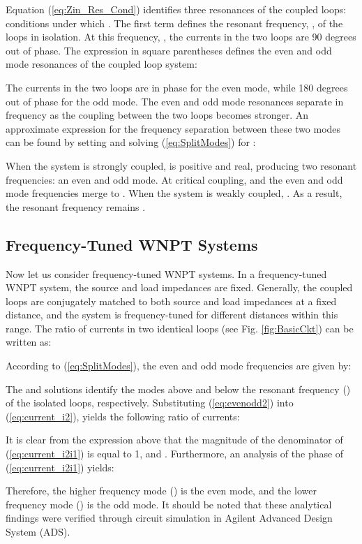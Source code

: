 \documentclass[journal]{IEEEtran}
\begin{document}
Equation (\ref{eq:Zin_Res_Cond}) identifies three resonances of the coupled loops: conditions under which . The first term defines the resonant frequency, , of the loops in isolation. At this frequency, , the currents in the two loops are 90 degrees out of phase. The expression in square parentheses defines the even and odd mode resonances of the coupled loop system:

The currents in the two loops are in phase for the even mode, while 180 degrees out of phase for the odd mode.  The even and odd mode resonances separate in frequency as the coupling between the two loops becomes stronger. An approximate expression for the frequency separation between these two modes can be found by setting  and solving (\ref{eq:SplitModes}) for :

When the system is strongly coupled,  is positive and real, producing two resonant frequencies: an even and odd mode. At critical coupling,  and the even and odd mode frequencies merge to . When the system is weakly coupled, . As a result, the resonant frequency remains .

\subsection{Frequency-Tuned WNPT Systems}
\label{sec:FreqTune}

Now let us consider frequency-tuned WNPT systems. In a frequency-tuned WNPT system, the source and load impedances are fixed. Generally, the coupled loops are conjugately matched to both source and load impedances at a fixed distance, and the system is frequency-tuned for different distances within this range.
The ratio of currents in two identical loops (see Fig. \ref{fig:BasicCkt}) can be written as:

According to (\ref{eq:SplitModes}), the even and odd mode frequencies are given by:

The  and  solutions identify the modes above and below the resonant frequency () of the isolated loops, respectively. Substituting (\ref{eq:evenodd2}) into (\ref{eq:current_i2}), yields the following ratio of currents:

 It is clear from the expression above that the magnitude of the denominator of (\ref{eq:current_i2i1}) is equal to 1, and .
Furthermore, an analysis of the phase of (\ref{eq:current_i2i1}) yields:


Therefore, the higher frequency mode () is the even mode, and the lower frequency mode () is the odd mode. It should be noted that these analytical findings were verified through circuit simulation in Agilent Advanced Design System (ADS).
\end{document}
